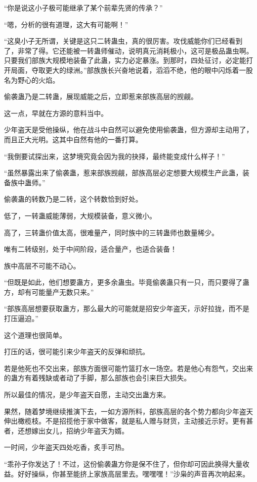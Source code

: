 \begin{this_body}
“你是说这小子极可能继承了某个前辈先贤的传承？”

“嗯，分析的很有道理，这大有可能啊！”

“这臭小子无所谓，关键是这只二转蛊虫，真的很厉害。攻伐威能你们已经看到了，非常了得。它还能被一转蛊师催动，说明真元消耗极小，这可是极品蛊虫啊。只要我们部族大规模地装备了此蛊，实力必定暴涨。到那时，四处征讨，必定能打开局面，夺取更大的绿洲。”部族族长兴奋地说着，滔滔不绝，他的眼中闪烁着一股名为野心的火焰。

偷袭蛊乃是二转蛊，展现威能之后，立即惹来部族高层的觊觎。

这一点，早就在方源的意料当中。

少年盗天是受他操纵，他在战斗中自然可以避免使用偷袭蛊，但方源却主动用了，而且正大光明。这其中自然有他的一番打算。

“我倒要试探出来，这梦境究竟会因为我的抉择，最终能变成什么样子！”

“虽然暴露出来了偷袭蛊，惹来部族觊觎，部族高层必定想要大规模生产此蛊，装备族中蛊师。”

偷袭蛊的转数乃是二转，这个转数恰到好处。

低了，一转蛊威能薄弱，大规模装备，意义微小。

高了，三转蛊价值太高，很难量产，同时族中的三转蛊师也数量稀少。

唯有二转级别，处于中间阶段，适合量产，也适合装备！

族中高层不可能不动心。

“但既是如此，他们想要蛊方，更多余蛊虫。毕竟偷袭蛊只有一只，而只要得了蛊方，却有可能量产无数只来。”

“部族高层想要获取蛊方，那么最大的可能就是招安少年盗天，示好拉拢，而不是打压逼迫。”

这个道理也很简单。

打压的话，很可能引来少年盗天的反弹和顽抗。

若是他死也不交出来，部族方面很可能竹篮打水一场空。若是他心有怨气，交出来的蛊方有着残缺或者动了手脚，那么部族也会引来巨大损失。

所以最佳的情况，是少年盗天自愿，主动交出蛊方来。

果然，随着梦境继续推演下去，一如方源所料，部族高层的各个势力都向少年盗天伸出橄榄枝。不是招揽他于家中做客，就是私人赠与财货，主动接近示好。更有甚者，还想嫁出女儿，招纳少年盗天为婿。

一时间，少年盗天四处吃香，炙手可热。

“乖孙子你发达了！不过，这份偷袭蛊方你是保不住了，但你却可因此换得大量收益。好好操纵，你甚至能挤上家族高层里去。嘿嘿嘿！”沙枭的声音再次响起来。


\end{this_body}
